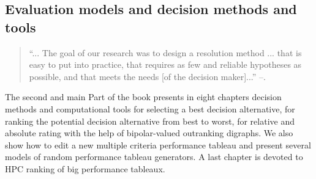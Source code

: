 % 
%
%

\begin{partbacktext}
  \part{Evaluation models and decision methods and tools}

  \begin{quotation}
“... The goal of our research was to design a resolution method ... that is easy to put into practice, that requires as few and reliable hypotheses as possible, and that meets the needs [of the decision maker]...” --\citep*{ROY-1966}.
\end{quotation}

  \vspace{1cm}
  \noindent The second and main Part of the book presents in eight chapters decision methods and computational tools for selecting a best decision alternative, for ranking the potential decision alternative from best to worst, for relative and absolute rating with the help of bipolar-valued outranking digraphs. We also show how to edit a new multiple criteria performance tableau and present several models of random performance tableau generators. A last chapter is devoted to HPC ranking of big performance tableaux.
\end{partbacktext}